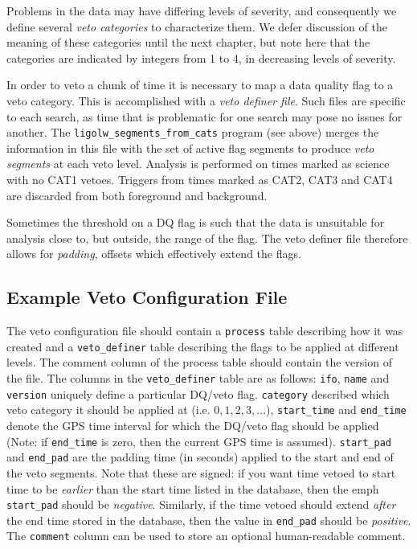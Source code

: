 Problems in the data may have differing levels of severity, and
consequently we define several \emph{veto categories} to characterize
them.  We defer discussion of the meaning of these categories until
the next chapter, but note here that the categories are indicated by
integers from 1 to 4, in decreasing levels of severity.

In order to veto a chunk of time it is necessary to map a data quality
flag to a veto category.  This is accomplished with a \emph{veto
definer file}.  Such files are specific to each search, as time that
is problematic for one search may pose no issues for another.  The
\texttt{ligolw\_segments\_from\_cats} program (see above) merges the
information in this file with the set of active flag segments to
produce \emph{veto segments} at each veto level.  Analysis is
performed on times marked as science with no CAT1 vetoes.  Triggers
from times marked as CAT2, CAT3 and CAT4 are discarded from both
foreground and background.

Sometimes the threshold on a DQ flag is such that the data is
unsuitable for analysis close to, but outside, the range of the flag.
The veto definer file therefore allows for \emph{padding}, offsets 
which effectively extend the flags.

\subsection{Example Veto Configuration File}

The veto configuration file should contain a \verb|process| table
describing how it was created and a \verb|veto_definer| table
describing the flags to be applied at different levels. The comment
column of the process table should contain the version of the file.
The columns in the \verb|veto_definer| table are as follows:
\verb|ifo|, \verb|name| and \verb|version| uniquely define a
particular DQ/veto flag. \verb|category| described which veto category
it should be applied at (i.e. $0, 1, 2, 3, \ldots$), \verb|start_time|
and \verb|end_time| denote the GPS time interval for which the DQ/veto
flag should be applied (Note: if \verb|end_time| is zero, then the
current GPS time is assumed). \verb|start_pad| and \verb|end_pad| are
the padding time (in seconds) applied to the start and end of the veto
segments. Note that these are signed: if you want time vetoed to start
time to be \emph{earlier} than the start time listed in the database,
then the emph \verb|start_pad| should be \emph{negative}. Similarly,
if the time vetoed should extend \emph{after} the end time stored in
the database, then the value in \verb|end_pad| should be
\emph{positive}. The \verb|comment| column can be used to store an
optional human-readable comment.


